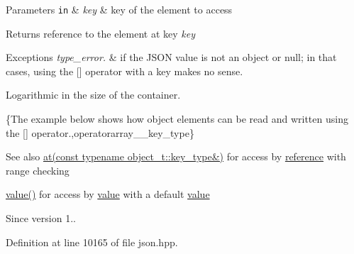 \begin{DoxyParams}[1]{Parameters}
\mbox{\tt in}  & {\em key} & key of the element to access\\
\hline
\end{DoxyParams}
\begin{DoxyReturn}{Returns}
reference to the element at key {\itshape key} 
\end{DoxyReturn}

\begin{DoxyExceptions}{Exceptions}
{\em type\+\_\+error.} & if the J\+S\+ON value is not an object or null; in that cases, using the \mbox{[}\mbox{]} operator with a key makes no sense.\\
\hline
\end{DoxyExceptions}
Logarithmic in the size of the container.

\{The example below shows how object elements can be read and written using the {\ttfamily \mbox{[}\mbox{]}} operator.,operatorarray\+\_\+\+\_\+key\+\_\+type\}

\begin{DoxySeeAlso}{See also}
\hyperlink{classnlohmann_1_1basic__json_a93403e803947b86f4da2d1fb3345cf2c}{at(const typename object\+\_\+t\+::key\+\_\+type\&)} for access by \hyperlink{classnlohmann_1_1basic__json_ac6a5eddd156c776ac75ff54cfe54a5bc}{reference} with range checking 

\hyperlink{classnlohmann_1_1basic__json_a9fa223b26419f018f9b18cc516e3a8e5}{value()} for access by \hyperlink{classnlohmann_1_1basic__json_a9fa223b26419f018f9b18cc516e3a8e5}{value} with a default \hyperlink{classnlohmann_1_1basic__json_a9fa223b26419f018f9b18cc516e3a8e5}{value}
\end{DoxySeeAlso}
\begin{DoxySince}{Since}
version 1.. 
\end{DoxySince}


Definition at line 10165 of file json.\+hpp.

